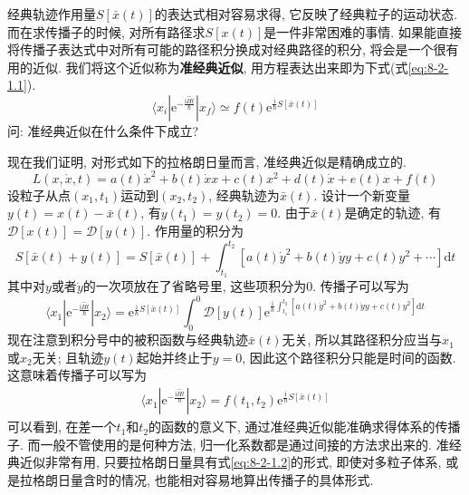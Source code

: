         经典轨迹作用量$S[\bar x(t)]$的表达式相对容易求得, 它反映了经典粒子的运动状态. 
        而在求传播子的时候, 对所有路径求$S[x(t)]$是一件非常困难的事情. 
        如果能直接将传播子表达式中对所有可能的路径积分换成对经典路径的积分, 将会是一个很有用的近似. 
        我们将这个近似称为\textbf{准经典近似}, 用方程表达出来即为下式(式\ref{eq:8-2-1.1}). 
        \begin{equation}\label{eq:8-2-1.1}
            \langle x_i | \mathrm{e}^{-\frac {\mathrm{i}\hat{H}t}{\hslash}} | x_f \rangle \simeq f(t) \mathrm{e}^{ \frac{\mathrm{i}}{\hslash} S[\bar x(t)] } 
        \end{equation}
        问: 准经典近似在什么条件下成立?

        \splitline

        现在我们证明, 对形式如下的拉格朗日量而言, 准经典近似是精确成立的. 
        \begin{equation}\label{eq:8-2-1.2}
            L(x, \dot x, t) = a(t)\dot x^2 + b(t) \dot x x + c(t) x^2 + d(t) \dot x + e(t) x + f(t)
        \end{equation}
        设粒子从点$(x_1, t_1)$运动到$(x_2, t_2)$, 经典轨迹为$\bar x(t)$. 设计一个新变量$y(t) = x(t) - \bar x(t)$, 有$y(t_1) = y(t_2) = 0$. 
        由于$\bar x(t)$是确定的轨迹, 有$\mathcal{D}[x(t)] = \mathcal{D}[y(t)]$. 作用量的积分为
        \begin{equation}
            S[\bar x(t) + y(t)] = S[\bar x(t)] + \int_{t_1}^{t_2} [a(t)\dot y^2 + b(t) \dot y y + c(t) y^2 + \cdots] \mathrm{d}t
        \end{equation}
        其中对$y$或者$\dot y$的一次项放在了省略号里, 这些项积分为0. 传播子可以写为
        \begin{equation}
            \langle x_1 | \mathrm{e}^{-\frac {\mathrm{i}\hat{H}t}{\hslash}} | x_2 \rangle 
            = \mathrm{e}^{ \frac{\mathrm{i}}{\hslash} S[\bar x(t)] } \int_0^0 \mathcal{D}[y(t)] \mathrm{e}^{ 
                \frac{\mathrm{i}}{\hslash} \int_{t_1}^{t_2} [a(t)\dot y^2 + b(t) \dot y y + c(t) y^2] \mathrm{d}t 
                }
        \end{equation}
        现在注意到积分号中的被积函数与经典轨迹$\bar x(t)$无关, 所以其路径积分应当与$x_1$或$x_2$无关; 且轨迹$y(t)$起始并终止于$y=0$, 因此这个路径积分只能是时间的函数. 这意味着传播子可以写为
        \begin{equation}\begin{aligned}
            \langle x_1 | \mathrm{e}^{-\frac {\mathrm{i}\hat{H}t}{\hslash}} | x_2 \rangle = f(t_1, t_2) \mathrm{e}^{ 
                \frac{\mathrm{i}}{\hslash} S[\bar x(t)] 
                } 
        \end{aligned}\end{equation}
        可以看到, 在差一个$t_1$和$t_2$的函数的意义下, 通过准经典近似能准确求得体系的传播子. 
        而一般不管使用的是何种方法, 归一化系数都是通过间接的方法求出来的. 准经典近似非常有用, 只要拉格朗日量具有式\ref{eq:8-2-1.2}的形式, 即使对多粒子体系, 或是拉格朗日量含时的情况, 也能相对容易地算出传播子的具体形式. 

